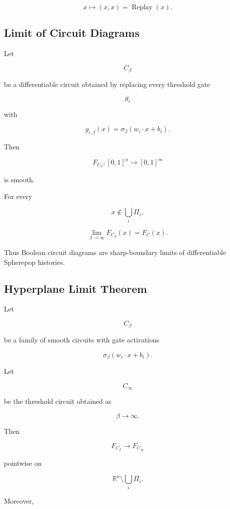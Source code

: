 \documentclass[12pt,oneside]{article}
\theoremstyle{definition}
\theoremstyle{remark}
\begin{document}
\[
x
\longmapsto
(x,x)
=
\operatorname{Replay}(x).
\]

\subsection*{Limit of Circuit Diagrams}

Let

\[
C_\beta
\]

be a differentiable circuit obtained by replacing every threshold gate

\[
g_i
\]

with

\[
g_{i,\beta}(x)
=
\sigma_\beta(w_i\cdot x+b_i).
\]

Then

\[
F_{C_\beta}
:
[0,1]^n
\rightarrow
[0,1]^m
\]

is smooth.

For every

\[
x
\notin
\bigcup_i \Pi_i,
\]

\[
\lim_{\beta\rightarrow\infty}
F_{C_\beta}(x)
=
F_C(x).
\]

Thus Boolean circuit diagrams are sharp-boundary limits of differentiable
Spherepop histories.

\subsection*{Hyperplane Limit Theorem}

Let

\[
C_\beta
\]

be a family of smooth circuits with gate activations

\[
\sigma_\beta(w_i\cdot x+b_i).
\]

Let

\[
C_\infty
\]

be the threshold circuit obtained as

\[
\beta\rightarrow\infty.
\]

Then

\[
F_{C_\beta}
\rightarrow
F_{C_\infty}
\]

pointwise on

\[
\mathbb R^n
\setminus
\bigcup_i\Pi_i.
\]

Moreover,
\end{document}
